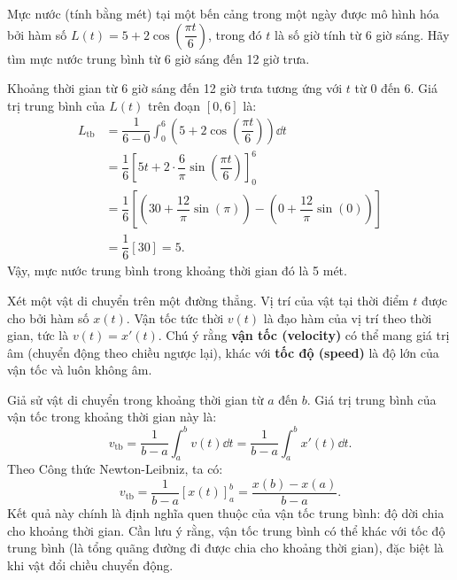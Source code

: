 \begin{example}
    Mực nước (tính bằng mét) tại một bến cảng trong một ngày được mô hình hóa bởi hàm số $L(t) = 5 + 2\cos\left(\dfrac{\pi t}{6}\right)$, trong đó $t$ là số giờ tính từ 6 giờ sáng. Hãy tìm mực nước trung bình từ 6 giờ sáng đến 12 giờ trưa.
\end{example}
\begin{solution}
    Khoảng thời gian từ 6 giờ sáng đến 12 giờ trưa tương ứng với $t$ từ $0$ đến $6$. Giá trị trung bình của $L(t)$ trên đoạn $[0, 6]$ là:
    \begin{align*}
        L_{\text{tb}} &= \dfrac{1}{6-0} \int_0^6 \left(5 + 2\cos\left(\dfrac{\pi t}{6}\right)\right) \dd t \\
        &= \dfrac{1}{6} \left[ 5t + 2 \cdot \dfrac{6}{\pi}\sin\left(\dfrac{\pi t}{6}\right) \right]_0^6 \\
        &= \dfrac{1}{6} \left[ \left(30 + \dfrac{12}{\pi}\sin(\pi)\right) - \left(0 + \dfrac{12}{\pi}\sin(0)\right) \right] \\
        &= \dfrac{1}{6} [30] = 5.
    \end{align*}
    Vậy, mực nước trung bình trong khoảng thời gian đó là 5 mét.
\end{solution}

\begin{example}
    Xét một vật di chuyển trên một đường thẳng. Vị trí của vật tại thời điểm $t$ được cho bởi hàm số $x(t)$. Vận tốc tức thời $v(t)$ là đạo hàm của vị trí theo thời gian, tức là $v(t) = x'(t)$. Chú ý rằng \textbf{vận tốc (velocity)} có thể mang giá trị âm (chuyển động theo chiều ngược lại), khác với \textbf{tốc độ (speed)} là độ lớn của vận tốc và luôn không âm.
    
    Giả sử vật di chuyển trong khoảng thời gian từ $a$ đến $b$. Giá trị trung bình của vận tốc trong khoảng thời gian này là:
    \[ v_{\text{tb}} = \dfrac{1}{b-a} \int_a^b v(t) \dd t = \dfrac{1}{b-a} \int_a^b x'(t) \dd t. \]
    Theo Công thức Newton-Leibniz, ta có:
    \[ v_{\text{tb}} = \dfrac{1}{b-a} \left[ x(t) \right]_a^b = \dfrac{x(b) - x(a)}{b-a}. \]
    Kết quả này chính là định nghĩa quen thuộc của vận tốc trung bình: độ dời chia cho khoảng thời gian. Cần lưu ý rằng, vận tốc trung bình có thể khác với tốc độ trung bình (là tổng quãng đường đi được chia cho khoảng thời gian), đặc biệt là khi vật đổi chiều chuyển động.
\end{example}

